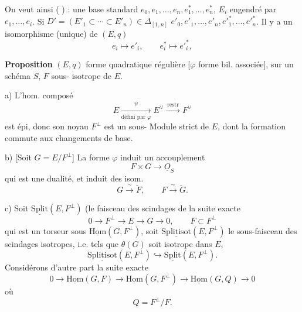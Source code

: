 \documentclass[11pt,a4paper]{article}
\begin{document}
On veut ainsi \ill{} (\ill{} \ill{}) \ill{} : une base standard
$e_0, e_1,\ldots,e_n, e_1^{*},\ldots,e_n^{*}$, 
$E_i$ engendré par $e_1,\ldots,e_i$. 
Si $D'=(E'_1\subset\cdots\subset E'_n)\in\Delta_{[1,n]}$ \ill{}
$e'_0, e'_1,\ldots,e'_n, e'^{*}_1,\ldots,e'^{*}_n$.
Il y a un isomorphisme (unique) de $(E,q)$
\[
e_i\mapsto e'_i,\qquad e_i^{*}\mapsto e'^{*}_i ,
\]

\textbf{Proposition} $(E,q)$ forme quadratique régulière [$\varphi$ forme bil.
associée], sur un schéma $S$, $F$ sous- 
 isotrope de $E$.

a) L'hom. composé
\[
E \xrightarrow[\text{défini par }\varphi]{\ \psi\ } E^{\vee} \xrightarrow{\ \text{restr}\ } F^{\vee}
\]
est épi, donc son noyau $F^{\perp}$ est un sous- Module strict de
$E$, dont la formation commute aux changements de base.

b) [Soit $G=E/F^{\perp}$] La forme $\varphi$ induit un accouplement
\[
F\times G \longrightarrow \underline{O}_S
\]
qui est une dualité, et induit des isom.
\[
G \xrightarrow{\ \sim\ } \check F,\qquad F \xrightarrow{\ \sim\ } \check G .
\]

c) Soit $\underline{\mathrm{Split}}(E,F^{\perp})$ 
(le faisceau des scindages de la suite exacte
\[
0\longrightarrow F^{\perp} \longrightarrow E \longrightarrow G \longrightarrow 0,
\qquad F\subset F^{\perp}
\]
qui est un torseur sous $\underline{\mathrm{Hom}}(G,F^{\perp})$, 
soit $\underline{\mathrm{Splitisot}}(E,F^{\perp})$ le sous-faisceau des scindages
\struck{\ill{}} isotropes, i.e. tels que $\theta(G)$ soit  isotrope dans
$E$, \struck{\ill{}}
\[
\underline{\mathrm{Splitisot}}(E,F^{\perp}) \hookrightarrow \underline{\mathrm{Split}}(E,F^{\perp}).
\]
Considérons d'autre part la suite exacte
\[
0\longrightarrow \underline{\mathrm{Hom}}(G,F) \longrightarrow \underline{\mathrm{Hom}}(G,F^{\perp}) \longrightarrow \underline{\mathrm{Hom}}(G,Q) \longrightarrow 0
\]
où
\[
Q = F^{\perp}/F .
\]
\end{document}
